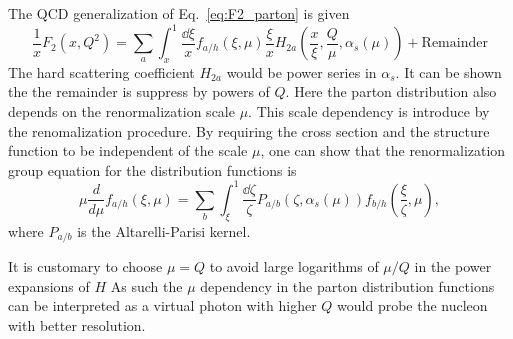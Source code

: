 The QCD generalization of Eq.\ \ref{eq:F2_parton} is given 
\begin{equation}
\frac{1}{x}F_2\left(x,Q^2\right) = \sum_a \int_x^1 \frac{\dd{\xi}}{x}f_{a/h}\left(\xi,\mu\right)\frac{\xi}{x}H_{2a}\left( \frac{x}{\xi}, \frac{Q}{\mu}, \alpha_s\left(\mu\right)\right)
	+ \text{Remainder}
\end{equation}
The hard scattering coefficient $H_{2a}$ would be power series in $\alpha_s$. It
can be shown the the remainder is suppress by powers of $Q$. Here the parton 
distribution also depends on the renormalization scale $\mu$. This scale 
dependency is introduce by the renomalization procedure. By requiring the cross 
section and the structure function to be independent of the scale $\mu$,
one can show that the renormalization group equation for the distribution 
functions is
\begin{equation}
	\mu\frac{d}{d\mu}f_{a/h}\left(\xi,\mu\right)=\sum_b \int_\xi^1 \frac{\dd{\zeta}}{\zeta} P_{a/b}\left(\zeta,\alpha_s\left(\mu\right)\right) f_{b/h}\left(\frac{\xi}{\zeta},\mu\right),
\end{equation}
where $P_{a/b}$ is the Altarelli-Parisi kernel\cite{altarelli1977}. 

It is customary to choose $\mu =Q$ to avoid large logarithms of $\mu /Q$ in the 
power expansions of $H$ As such the $\mu$ dependency in the parton distribution 
functions can be interpreted as a virtual photon with higher $Q$ would probe the
nucleon with better resolution. 

